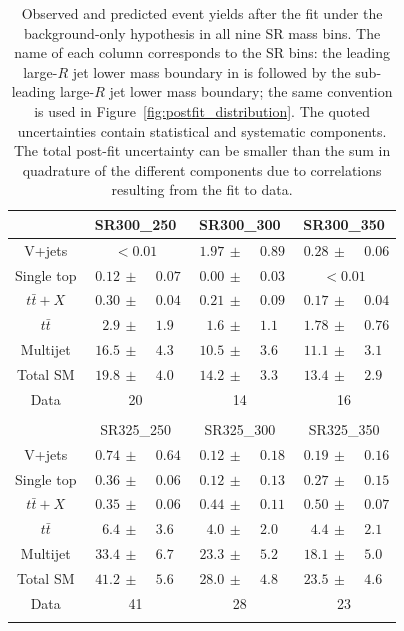 \begin{table}[htb]
    \caption{Observed and predicted event yields after the fit under the background-only hypothesis in all nine \allhad SR mass bins. The name of each column corresponds to the SR bins: the leading large-$R$ jet lower mass boundary in \GeV is followed by the sub-leading large-$R$ jet lower mass boundary; the same convention is used in Figure~\ref{fig:postfit_distribution}. The quoted uncertainties contain statistical and systematic components. The total post-fit uncertainty can be smaller than the sum in quadrature of the different components due to correlations resulting from the fit to data.}
    \label{tab:allhad_sr_yields}
    \centering
    \begin{tabular}{c|r@{}lr@{}lr@{}l}
       & \multicolumn{2}{c}{SR300\_250} & \multicolumn{2}{c}{SR300\_300} & \multicolumn{2}{c}{SR300\_350} \\ 
      \toprule
      V+jets & \multicolumn{2}{c}{$<0.01$}  & $\,\,1.97\,\pm\,$ & $0.89$ & $\,\,0.28\,\pm\,$ & $0.06$ \\ 
      Single top & $0.12\,\pm\,$ & $0.07$ & $0.00\,\pm\,$ & $0.03$ & \multicolumn{2}{c}{$<0.01$}  \\ 
      $t\bar{t}+X$ & $0.30\,\pm\,$ & $0.04$ & $0.21\,\pm\,$ & $0.09$ & $0.17\,\pm\,$ & $0.04$  \\ 
      $t\bar{t}$ & $2.9\,\pm\,$ & $1.9$ & $1.6\,\pm\,$ & $1.1$ & $1.78\,\pm\,$ & $0.76$ \\ 
      Multijet & $16.5\,\pm\,$ & $4.3$ & $10.5\,\pm\,$ & $3.6$ & $11.1\,\pm\,$ & $3.1$  \\ 
      \midrule
       Total SM & $19.8\,\pm\,$ & $4.0$ & $14.2\,\pm\,$ & $3.3$ & $13.4\,\pm\,$ & $2.9$ \\ 
      \midrule
      Data & \multicolumn{2}{c}{20} & \multicolumn{2}{c}{14} & \multicolumn{2}{c}{16} \\ 
      \bottomrule
      \multicolumn{4}{c}{\phantom{0}}\\

       & \multicolumn{2}{c}{SR325\_250} & \multicolumn{2}{c}{SR325\_300} & \multicolumn{2}{c}{SR325\_350} \\ 
      \toprule
      V+jets & $\,\,0.74\,\pm\,$ & $0.64$ & $\,\,0.12\,\pm\,$ & $0.18$ & $\,\,0.19\,\pm\,$ & $0.16$ \\ 
      Single top & $0.36\,\pm\,$ & $0.06$ & $0.12\,\pm\,$ & $0.13$ & $0.27\,\pm\,$ & $0.15$ \\ 
      $t\bar{t}+X$ & $0.35\,\pm\,$ & $0.06$ & $0.44\,\pm\,$ & $0.11$ & $0.50\,\pm\,$ & $0.07$ \\ 
      $t\bar{t}$ & $6.4\,\pm\,$ & $3.6$ & $4.0\,\pm\,$ & $2.0$ & $4.4\,\pm\,$ & $2.1$ \\ 
      Multijet & $33.4\,\pm\,$ & $6.7$ & $23.3\,\pm\,$ & $5.2$ & $18.1\,\pm\,$ & $5.0$ \\ 
      \midrule
       Total SM & $41.2\,\pm\,$ & $5.6$ & $28.0\,\pm\,$ & $4.8$ & $23.5\,\pm\,$ & $4.6$ \\ 
      \midrule
      Data & \multicolumn{2}{c}{41} & \multicolumn{2}{c}{28} & \multicolumn{2}{c}{23} \\ 
      \bottomrule
      \multicolumn{4}{c}{\phantom{0}}\\


\end{tabular}
\end{table}

